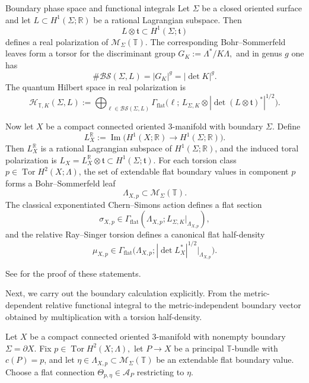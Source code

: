 \documentclass[12pt]{amsart}
\makeatletter
\renewcommand\subsection{\@startsection{subsection}{2}%
  \z@{.5\linespacing\@plus.7\linespacing}{-.5em}%
  {\normalfont\bfseries}}
\numberwithin{equation}{section}
\DeclareMathOperator{\Det}{det}
\makeatother
\begin{document}
\subsection{Boundary phase space and functional integrals}
Let \(\Sigma\) be a closed oriented surface and let $L\subset H^1(\Sigma;\mathbb R)$ 
be a rational Lagrangian subspace. Then
\[
L\otimes\mathfrak t\subset H^1(\Sigma;\mathfrak t)
\]
defines a real polarization of \(\mathcal M_\Sigma(\mathbb T)\). The corresponding
Bohr--Sommerfeld leaves form a torsor for the discriminant group $G_K:=\Lambda^*/K\Lambda,$
and in genus \(g\) one has
\[
\#\mathcal{BS}(\Sigma,L)=|G_K|^g=|\det K|^g.
\]
The quantum Hilbert space in real polarization is
\begin{equation}
\label{eq:toral-Hilbert-space-unified}
\mathcal H_{\mathbb T,K}(\Sigma,L)
:=
\bigoplus_{\ell\in \mathcal{BS}(\Sigma,L)}
\Gamma_{\mathrm{flat}}
\bigl(\ell;\,L_{\Sigma,K}\otimes |\Det (L\otimes\mathfrak t)^*|^{1/2}\bigr).
\end{equation}

Now let \(X\) be a compact connected oriented \(3\)-manifold with boundary \(\Sigma\). Define
\[
L_X^{\mathbb R}
:=
\operatorname{Im}\bigl(H^1(X;\mathbb R)\to H^1(\Sigma;\mathbb R)\bigr).
\]
Then \(L_X^{\mathbb R}\) is a rational Lagrangian subspace of \(H^1(\Sigma;\mathbb R)\), and
the induced toral polarization is \(L_X=L_X^{\mathbb R}\otimes\mathfrak t\subset H^1(\Sigma;\mathfrak t)\). For each torsion class \(p\in \operatorname{Tor}H^2(X;\Lambda)\), the set of extendable flat
boundary values in component \(p\) forms a Bohr--Sommerfeld leaf
\[
\Lambda_{X,p}\subset \mathcal M_\Sigma(\mathbb T).
\]
The classical exponentiated Chern--Simons action defines a flat section
\[
\sigma_{X,p}\in
\Gamma_{\mathrm{flat}}(\Lambda_{X,p};L_{\Sigma,K}|_{\Lambda_{X,p}}),
\]
and the relative Ray--Singer torsion defines a canonical flat half-density
\[
\mu_{X,p}\in
\Gamma_{\mathrm{flat}}\bigl(\Lambda_{X,p};
|\Det L_X^*|^{1/2}|_{\Lambda_{X,p}}\bigr).
\]

See \cite[Secs.~2--3]{Galviz2} for the proof of these statements.

Next, we carry out the boundary calculation explicitly. From the metric-dependent relative functional integral to the metric-independent boundary vector obtained by multiplication
with a torsion half-density.

Let \(X\) be a compact connected oriented \(3\)-manifold with nonempty boundary
\(\Sigma=\partial X\). Fix $p\in \operatorname{Tor}H^2(X;\Lambda),$ let \(P\to X\) be a principal \(\mathbb T\)-bundle with \(c(P)=p\), and let
\(\eta\in \Lambda_{X,p}\subset \mathcal M_\Sigma(\mathbb T)\) be an extendable flat boundary value.
Choose a flat connection \(\Theta_{p,\eta}\in \mathcal A_P\) restricting to \(\eta\).
\end{document}
